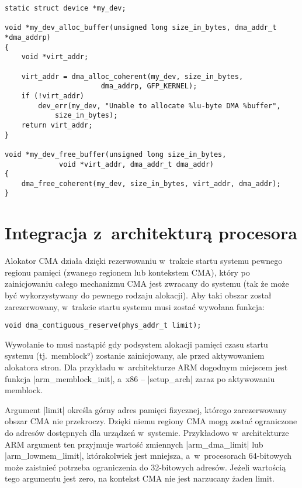 \begin{lstlisting}[float=tbhp,caption={Alokacja bufora DMA z~użyciem
      DMA API.},label=lst:dma-alloc-example]
static struct device *my_dev;

void *my_dev_alloc_buffer(unsigned long size_in_bytes, dma_addr_t *dma_addrp)
{
	void *virt_addr;

	virt_addr = dma_alloc_coherent(my_dev, size_in_bytes,
				       dma_addrp, GFP_KERNEL);
	if (!virt_addr)
		dev_err(my_dev, "Unable to allocate %lu-byte DMA %buffer",
			size_in_bytes);
	return virt_addr;
}

void *my_dev_free_buffer(unsigned long size_in_bytes,
			 void *virt_addr, dma_addr_t dma_addr)
{
	dma_free_coherent(my_dev, size_in_bytes, virt_addr, dma_addr);
}
\end{lstlisting}


\section{Integracja z~architekturą procesora}\label{sec:integrate-with-arch}

Alokator CMA działa dzięki rezerwowaniu w~trakcie startu systemu
pewnego regionu pamięci (zwanego regionem lub kontekstem CMA), który
po zainicjowaniu całego mechanizmu CMA jest zwracany do systemu (tak
że może być wykorzystywany do pewnego rodzaju alokacji).  Aby taki
obszar został zarezerwowany, w~trakcie startu systemu musi zostać
wywołana funkcja:

\begin{lstlisting}
void dma_contiguous_reserve(phys_addr_t limit);
\end{lstlisting}

Wywołanie to musi nastąpić gdy podsystem alokacji pamięci czasu startu
systemu (tj.\ \ang*{memblock}) zostanie zainicjowany, ale przed
aktywowaniem alokatora stron.  Dla przykładu w~architekturze ARM
dogodnym miejscem jest funkcja \code|arm_memblock_init|, a~x86 --
\code|setup_arch| zaraz po aktywowaniu memblock.

Argument \code|limit| określa górny adres pamięci fizycznej,
którego zarezerwowany obszar CMA nie przekroczy.  Dzięki niemu regiony
CMA mogą zostać ograniczone do adresów dostępnych dla urządzeń
w~systemie.  Przykładowo w~architekturze ARM argument ten przyjmuje
wartość zmiennych \code|arm_dma_limit| lub
\code|arm_lowmem_limit|, którakolwiek jest mniejsza,
a~w~procesorach 64-bitowych może zaistnieć potrzeba ograniczenia do
32-bitowych adresów.  Jeżeli wartością tego argumentu jest zero, na
kontekst CMA nie jest narzucany żaden limit.


